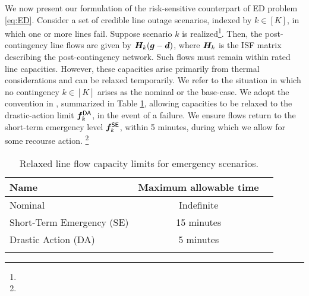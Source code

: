 
We now present our formulation of the risk-sensitive counterpart of ED problem \eqref{eq:ED}. Consider a set of credible line outage scenarios, indexed by $k\in[K]$, in which one or more lines fail. Suppose scenario $k$ is realized\footnote{}. Then, the post-contingency line flows are given by ${\bm{H}}_k ({\bm{g}} - {\bm{d}})$, where ${\bm{H}}_k$ is the ISF matrix describing the post-contingency network. Such flows must remain within rated line capacities. However, these capacities arise primarily from thermal considerations and can be relaxed temporarily. We refer to the situation in which no contingency $k\in[K]$ arises as the nominal or the base-case. 
We adopt the convention in \cite{national2010transmission}, summarized in Table \ref{tab:relaxed.line.limits}, allowing capacities to be relaxed to the drastic-action limit ${\bm{f}}_k^{\sf DA}{}$, in the event of a failure. We ensure flows return to the short-term emergency level ${\bm{f}}_k^{\sf SE}{}$, within 5 minutes, during which we allow for some recourse action. \footnote{}
%
\begin{table}[ht]
    \centering
    \caption{Relaxed line flow capacity limits for emergency scenarios.}
    \begin{tabular}{l c c}
        \toprule
         \textbf{Name} & \textbf{Maximum allowable time} \\
         \midrule
         Nominal & Indefinite \\
         Short-Term Emergency (SE) & 15 minutes \\
         Drastic Action (DA) & 5 minutes \\
         \bottomrule \\
    \end{tabular}
    \label{tab:relaxed.line.limits}
\end{table}
